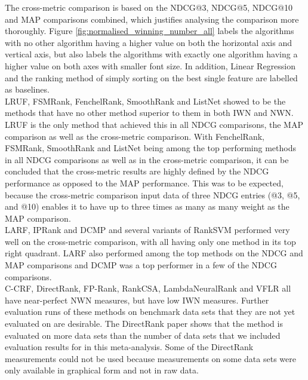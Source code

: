 The cross-metric comparison is based on the \ac{NDCG}@3, \ac{NDCG}@5, \ac{NDCG}@10 and \ac{MAP} comparisons combined, which justifies analysing the comparison more thoroughly. Figure \ref{fig:normalised_winning_number_all} labels the algorithms with no other algorithm having a higher value on both the horizontal axis and vertical axis, but also labels the algorithms with exactly one algorithm having a higher value on both axes with smaller font size. In addition, Linear Regression and the ranking method of simply sorting on the best single feature are labelled as baselines.\\

LRUF, FSMRank, FenchelRank, SmoothRank and ListNet showed to be the methods that have no other method superior to them in both \ac{IWN} and \ac{NWN}. LRUF is the only method that achieved this in all \ac{NDCG} comparisons, the \ac{MAP} comparison as well as the cross-metric comparison. With FenchelRank, FSMRank, SmoothRank and ListNet being among the top performing methods in all \ac{NDCG} comparisons as well as in the cross-metric comparison, it can be concluded that the cross-metric results are highly defined by the \ac{NDCG} performance as opposed to the \ac{MAP} performance. This was to be expected, because the cross-metric comparison input data of three \ac{NDCG} entries (@3, @5, and @10) enables it to have up to three times as many as many weight as the \ac{MAP} comparison.\\

LARF, \acs{IP}Rank and DCMP and several variants of Rank\ac{SVM} performed very well on the cross-metric comparison, with all having only one method in its top right quadrant. LARF also performed among the top methods on the \ac{NDCG} and \ac{MAP} comparisons and DCMP was a top performer in a few of the \ac{NDCG} comparisons.\\

C-CRF, DirectRank, FP-Rank, RankCSA, LambdaNeuralRank and VFLR all have near-perfect \ac{NWN} measures, but have low \ac{IWN} measures. Further evaluation runs of these methods on benchmark data sets that they are not yet evaluated on are desirable. The DirectRank paper \cite{Tan2013} shows that the method  is evaluated on more data sets than the number of data sets that we included evaluation results for in this meta-analysis. Some of the DirectRank measurements could not be used because measurements on some data sets were only available in graphical form and not in raw data.\\

